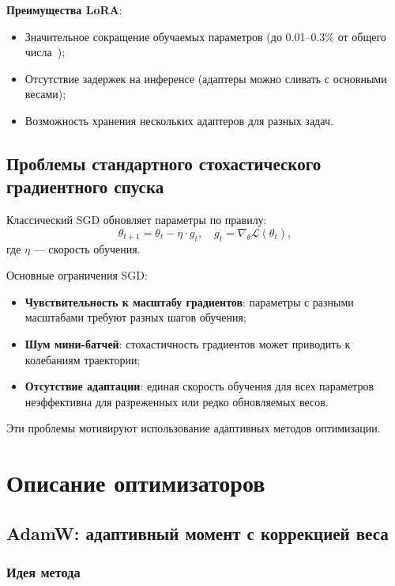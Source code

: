 \documentclass[a4paper,12pt]{article}
\begin{document}
\textbf{Преимущества LoRA}:
\begin{itemize}
    \item Значительное сокращение обучаемых параметров (до 0.01--0.3\% от общего числа~\cite{hu2021lora});
    \item Отсутствие задержек на инференсе (адаптеры можно сливать с основными весами);
    \item Возможность хранения нескольких адаптеров для разных задач.
\end{itemize}

\subsection{Проблемы стандартного стохастического градиентного спуска}

Классический SGD обновляет параметры по правилу:
\begin{equation}
    \theta_{t+1} = \theta_t - \eta \cdot g_t, \quad g_t = \nabla_\theta \mathcal{L}(\theta_t),
\end{equation}
где $\eta$ --- скорость обучения.

Основные ограничения SGD:
\begin{itemize}
    \item \textbf{Чувствительность к масштабу градиентов}: параметры с разными масштабами требуют разных шагов обучения;
    \item \textbf{Шум мини-батчей}: стохастичность градиентов может приводить к колебаниям траектории;
    \item \textbf{Отсутствие адаптации}: единая скорость обучения для всех параметров неэффективна для разреженных или редко обновляемых весов.
\end{itemize}

Эти проблемы мотивируют использование адаптивных методов оптимизации.
\newpage

\section{Описание оптимизаторов}
\label{sec:optimizers}

\subsection{AdamW: адаптивный момент с коррекцией веса}

\subsubsection{Идея метода}
\end{document}
